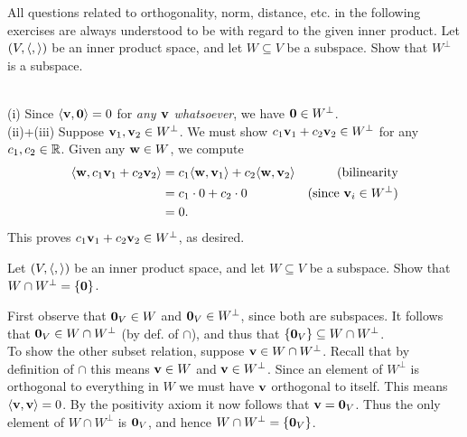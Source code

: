 All questions related to orthogonality, norm, distance, etc. in the following exercises are always understood to be with regard to the given inner product. 
\bb
\ii Let $(V, \langle  , \rangle)$ be an inner product space, and let $W\subseteq V$ be a subspace. Show that $W^\perp$ is a subspace. 
\\
\begin{solution}
\noindent  \\
(i) Since $\langle {\mathbf v},{\mathbf 0}\rangle=0$ for {\em any ${\mathbf v}$ whatsoever}, we have ${\mathbf 0}\in W^\perp$. \\
(ii)+(iii) Suppose ${\mathbf v}_1,{\mathbf v}_2\in W^\perp$. We must show $c_1{\mathbf v}_1+c_2{\mathbf v}_2\in W^\perp$ for any $c_1,c_2\in{\mathbb R}$. Given any ${\mathbf w}\in W$, we compute 
\begin{align*}
\langle {\mathbf w}, c_1{\mathbf v}_1+c_2{\mathbf v}_2\rangle&=c_1\langle {\mathbf w},{\mathbf v}_1\rangle+c_2\langle {\mathbf w},{\mathbf v}_2\rangle &\text{(bilinearity}\\
&=c_1\cdot 0+c_2\cdot 0 &\text{(since ${\mathbf v}_i\in W^\perp$)}\\
&=0.
\end{align*}  
This proves $c_1{\mathbf v}_1+c_2{\mathbf v}_2\in W^\perp$, as desired. 
\end{solution}
\ii Let $(V, \langle  , \rangle)$ be an inner product space, and let $W\subseteq V$ be a subspace. Show that \\ $W\cap W^\perp=\{{\mathbf 0}\}$. 
\\
\begin{solution}
\noindent
First observe that ${\mathbf 0}_V\in W$ and ${\mathbf 0}_V\in W^\perp$, since both are subspaces. It follows that ${\mathbf 0}_V\in W\cap W^\perp$ (by def. of $\cap$), and thus that $\{{\mathbf 0}_V\}\subseteq W\cap W^\perp$. 
\\
To show the other subset relation, suppose ${\mathbf v}\in W\cap W^\perp$. Recall that by definition of $\cap$ this means ${\mathbf v}\in W$ and ${\mathbf v}\in W^\perp$. Since an element of $W^\perp$ is orthogonal to everything in $W$ we must have ${\mathbf v}$ orthogonal to itself. This means $\langle{\mathbf v},{\mathbf v}\rangle=0$. By the positivity axiom it now follows that ${\mathbf v}={\mathbf 0}_V$. Thus the only element of $W\cap W^\perp$ is ${\mathbf 0}_V$, and hence $W\cap W^\perp=\{{\mathbf 0}_V\}$. 
\end{solution}

